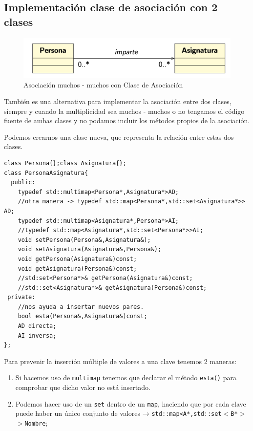 \subsection{Implementación clase de asociación con 2 clases}

\begin{center}
	\begin{figure}[h]
	\includegraphics[width=\textwidth]{Imagenes/AClS2.png}
	\caption{Asociación muchos - muchos con Clase de Asociación}
\end{figure}
\end{center}
También es una alternativa para implementar la asociación entre dos clases, siempre y cuando la 
multiplicidad sea muchos - muchos o no tengamos el código fuente de ambas clases y no podamos
incluir los métodos propios de la asociación.

Podemos crearnos una clase nueva, que representa la relación entre estas dos clases.
\begin{center}
	\begin{lstlisting}[frame=single]
class Persona{};class Asignatura{};
class PersonaAsignatura{
  public:
    typedef std::multimap<Persona*,Asignatura*>AD;
    //otra manera -> typedef std::map<Persona*,std::set<Asignatura*>> AD;
    typedef std::multimap<Asignatura*,Persona*>AI;
    //typedef std::map<Asignatura*,std::set<Persona*>>AI;
    void setPersona(Persona&,Asignatura&);
    void setAsignatura(Asignatura&,Persona&);
    void getPersona(Asignatura&)const;
    void getAsignatura(Persona&)const;
    //std:set<Persona*>& getPersona(Asignatura&)const;
    //std::set<Asignatura*>& getAsignatura(Persona&)const;
 private:
    //nos ayuda a insertar nuevos pares.
    bool esta(Persona&,Asignatura&)const;
    AD directa;
    AI inversa;
};
\end{lstlisting}
\end{center}
Para prevenir la inserción múltiple de valores a una clave tenemos 2 maneras:
\begin{enumerate}
	\item Si hacemos uso de \texttt{multimap} tenemos que declarar el método \texttt{esta()} para comprobar que dicho valor no está insertado.
	\item Podemos hacer uso de un \texttt {set} dentro de un \texttt{map}, haciendo que por cada clave puede haber un único conjunto de valores → \texttt{std::map<A*,std::set$<$B*$>$$>$Nombre$;$}
\end{enumerate}

